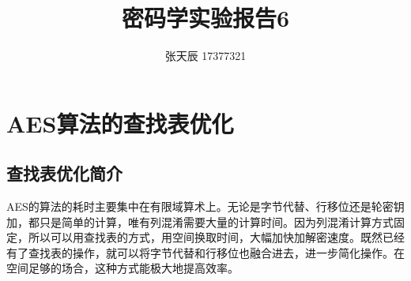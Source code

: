 \documentclass[11pt]{ctexart}
\title{密码学实验报告6}
\author{张天辰 17377321}
\begin{document}
\maketitle{}



\section{AES算法的查找表优化}
\subsection{查找表优化简介} %
AES的算法的耗时主要集中在有限域算术上。无论是字节代替、行移位还是轮密钥加，都只是简单的计算，唯有列混淆需要大量的计算时间。因为列混淆计算方式固定，所以可以用查找表的方式，用空间换取时间，大幅加快加解密速度。既然已经有了查找表的操作，就可以将字节代替和行移位也融合进去，进一步简化操作。在空间足够的场合，这种方式能极大地提高效率。
\end{document}
